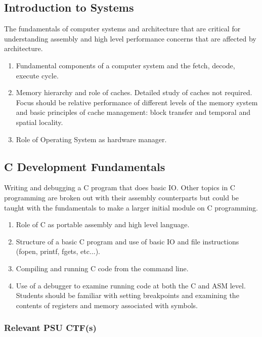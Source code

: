 \documentclass[12pt,letterpaper]{article}
\begin{document}
	\subsection{Introduction to Systems}

	The fundamentals of computer systems and architecture that are critical for understanding assembly and high level performance concerns that are affected by architecture.

	\begin{enumerate}
		\item Fundamental components of a computer system and the fetch, decode, execute cycle.
		\item Memory hierarchy and role of caches. Detailed study of caches not required. Focus should be relative performance of different levels of the memory system and basic principles of cache management: block transfer and temporal and spatial locality. 
		\item Role of Operating System as hardware manager.
	\end{enumerate}

	\subsection{C Development Fundamentals}

	Writing and debugging a C program that does basic IO. Other topics in C programming are broken out with their assembly counterparts but could be taught with the fundamentals to make a larger initial module on C programming.

	\begin{enumerate}
		\item Role of C as portable assembly and high level language.
		\item Structure of a basic C program and use of basic IO and file instructions (fopen, printf, fgets, etc...).
		\item Compiling and running C code from the command line.
		\item Use of a debugger to examine running code at both the C and ASM level. Students should be familiar with setting breakpoints and examining the contents of registers and memory associated with symbols.
	\end{enumerate}
	
	\subsubsection*{Relevant PSU CTF(s)}
\end{document}
